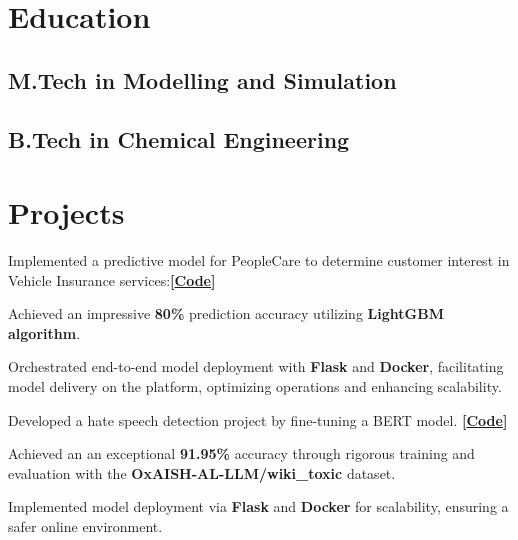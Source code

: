 \documentclass[]{deedy-resume-openfont}
\begin{document}
\begin{minipage}[t]{0.66\textwidth} 




\section{Education} 
\subsection{M.Tech in Modelling and Simulation }
\sectionsep
\subsection{B.Tech in Chemical Engineering}
\sectionsep

\section{Projects}
\item Implemented a predictive model for PeopleCare to determine customer interest in Vehicle Insurance services:\textbf{[\href{https://github.com/Shyam-Sundar-7/PeopleCare}{Code}]}
\begin{tightemize}
\item Achieved an impressive \textbf{80\%} prediction accuracy  utilizing \textbf{LightGBM algorithm}.
\item Orchestrated end-to-end model deployment with  \textbf{Flask} and \textbf{Docker}, facilitating model delivery on the   platform, optimizing operations and enhancing scalability.
\end{tightemize}
\sectionsep

\item Developed a hate speech detection project by fine-tuning a BERT model. \textbf{[\href{https://github.com/Shyam-Sundar-7/Hate-Speech-recognition}{Code}]}
\begin{tightemize}
        \item Achieved an an exceptional \textbf{91.95\%} accuracy through rigorous training and evaluation with the \textbf{OxAISH-AL-LLM/wiki\_toxic} dataset.
        \item Implemented model deployment via \textbf{Flask} and \textbf{Docker} for scalability, ensuring a safer online environment.
\end{tightemize}
\sectionsep



\end{minipage}
\end{document}
